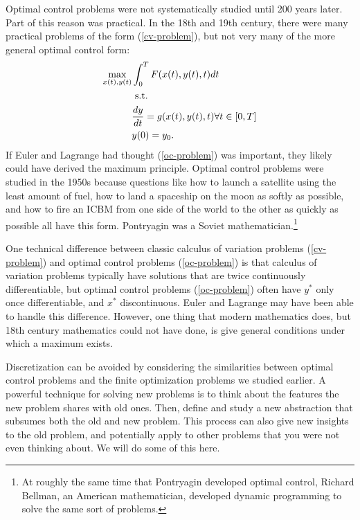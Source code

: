 \begin{history}
  Optimal control problems were not systematically studied until 200
  years later. Part of this reason was practical. In the 18th and 19th
  century, there were many practical problems of the form
  (\ref{cv-problem}), but not very many of the more general optimal
  control form:
  \begin{align}
    \max_{x(t),y(t)} & \int_0^T F(x(t),y(t),t) dt \notag \\
                     & \text{ s.t.} \label{oc-problem} \\
                     & \frac{d y}{dt} = g(x(t),y(t),t) \forall t \in
                       [0,T] \notag \\ 
                     & y(0) = y_0. \notag
  \end{align}
  If Euler and Lagrange had thought (\ref{oc-problem}) was important,
  they likely could have derived the maximum principle. Optimal
  control problems were studied in the 1950s because questions like
  how to launch a satellite using the least amount of fuel, how to
  land a spaceship on the moon as softly as possible, and how to fire
  an ICBM from one side of the world to the other as quickly as
  possible all have this form. Pontryagin was a Soviet
  mathematician.\footnote{At roughly the same time that Pontryagin
    developed optimal control, Richard Bellman, an American
    mathematician, developed dynamic programming to solve the same
    sort of problems.}  

  One technical difference between classic calculus of variation
  problems (\ref{cv-problem}) and optimal control problems
  (\ref{oc-problem}) is that calculus of variation problems typically
  have solutions that are twice continuously differentiable, but
  optimal control problems (\ref{oc-problem}) often have $y^*$ only
  once differentiable, and $x^*$ discontinuous. Euler and Lagrange may
  have been able to handle this difference. However, one thing that
  modern mathematics does, but 18th century mathematics could not have
  done, is give general conditions under which a maximum exists.
\end{history}

Discretization can be avoided by considering the similarities between
optimal control problems and the finite optimization problems we
studied earlier. A powerful technique for solving new problems is to
think about the features the new problem shares with old ones. Then,
define and study a new abstraction that subsumes both the old and new
problem. This process can also give new insights to the old problem,
and potentially apply to other problems that you were not even
thinking about. We will do some of this here.

